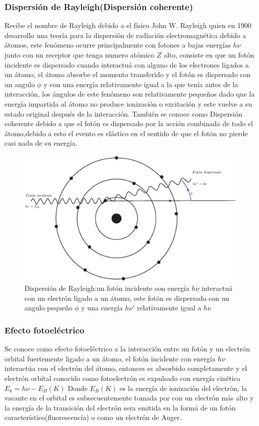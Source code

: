 \subsubsection{Dispersión de Rayleigh(Dispersión coherente)}
Recibe el nombre de Rayleigh debido a el físico John W. Rayleigh quien en 1900 desarrollo una teoría para la dispersión de radiación electromagnética debido a átomos, este fenómeno ocurre principalmente con fotones a bajas energías $h\nu$ junto con un receptor que tenga numero atómico $Z$ alto, consiste en que un fotón incidente es dispersado cuando interactuá con alguno de los electrones ligados a un átomo, el átomo absorbe el momento transferido y el fotón es dispersado con un angulo $\phi$ y con una energía relativamente igual a la que tenía antes de la interacción, los ángulos de este fenómeno son relativamente pequeños dado que la energía impartida al átomo no produce ionización o excitación y este vuelve a su estado original después de la interacción\cite{Podgorsak}.
También se conoce como Dispersión coherente debido a que el fotón es dispersado por  la acción combinada de todo el átomo,debido a esto el evento es elástico en el sentido de que el fotón no pierde casi nada de su energía\cite{Frank}.

\begin{figure}[htbp]
    \centering
    \includegraphics[width=.68\linewidth]{./Figures/Ray.eps}
    \caption[Dispersión de Rayleigh]{Dispersión de Rayleigh:un fotón incidente con energía $h\nu$ interactuá con un electrón ligado a un átomo, este fotón es dispersado con un angulo pequeño $\phi$ y una energía $h\nu '$ relativamente igual a $h\nu$ }
    \label{fig:DR}
\end{figure}


\subsubsection{Efecto fotoeléctrico}

Se conoce como efecto fotoeléctrico a la interacción entre un fotón y un electrón orbital fuertemente ligado a un átomo, el fotón incidente con energía $h\nu$ interactúa con el electrón del átomo, entonces es absorbido completamente y el electrón orbital conocido como fotoelectrón es expulsado con energía cinética $E_k=h\nu-E_B(K)$ Donde $E_B(K)$ es la energía de ionización del electrón, la vacante en el orbital es subsecuentemente tomada por con un electrón más alto y la energía de la transición del electrón sera emitida en la formá de un fotón característico(fluorescencia) o como un electrón de Auger.

